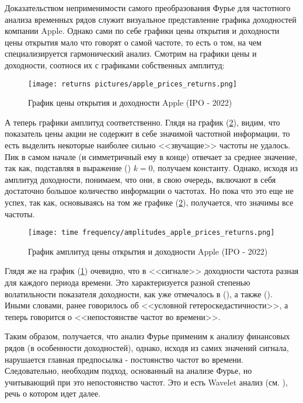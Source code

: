 Доказательством неприменимости самого преобразования Фурье для частотного анализа временных рядов служит визуальное представление графика доходностей компании Apple. Однако сами по себе графики цены открытия и доходности цены открытия мало что говорят о самой частоте, то есть о том, на чем специализируется гармонический анализ. Смотрим на графики цены и доходности, соотнося их с графиками собственных амплитуд:
\begin{figure}[H]
	\centering
	\texttt{[image: returns pictures/apple\_prices\_returns.png]}
	\caption{График цены открытия и доходности Apple (IPO - 2022)}
	\label{fig::apple_prices_returns}
\end{figure}
\noindent А теперь графики амплитуд соответственно. Глядя на график (\ref{fig::amplitudes_apple_prices_returns}), видим, что показатель цены акции не содержит в себе значимой частотной информации, то есть выделить некоторые наиболее сильно <<звучащие>> частоты не удалось. Пик в самом начале (и симметричный ему в конце) отвечает за среднее значение, так как, подставляя в выражение () $k = 0$, получаем константу. Однако, исходя из амплитуд доходности, понимаем, что они, в свою очередь, включают в себя достаточно большое количество информации о частотах. Но пока что это еще не успех, так как, основываясь на том же графике (\ref{fig::amplitudes_apple_prices_returns}), получается, что значимы все частоты. 
\begin{figure}[H]
	\centering
	\texttt{[image: time frequency/amplitudes\_apple\_prices\_returns.png]}
	\caption{График амплитуд цены открытия и доходности Apple (IPO - 2022)}
	\label{fig::amplitudes_apple_prices_returns}
\end{figure}
Глядя же на график (\ref{fig::apple_prices_returns}) очевидно, что в <<сигнале>> доходности частота разная для каждого периода времени. Это характеризуется разной степенью волатильности показателя доходности, как уже отмечалось в (), а также (). Иными словами, ранее говорилось об <<условной гетероскедастичности>>, а теперь говорится о <<непостоянстве частот во времени>>.

Таким образом, получается, что анализ Фурье применим к анализу финансовых рядов (в особенности доходностей), однако, исходя из самих значений сигнала, нарушается главная предпосылка - постоянство частот во времени. Следовательно, необходим подход, основанный на анализе Фурье, но учитывающий при это непостоянство частот. Это и есть Wavelet анализ (см. ), речь о котором идет далее.